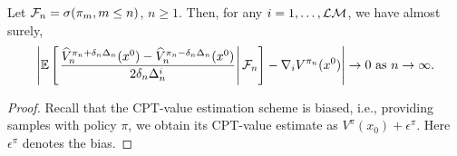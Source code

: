 \begin{lemma}
\label{lemma:1spsa-bias}
Let $\mathcal{F}_n = \sigma(\pi_m,m\le n)$, $n\ge 1$.
Then, for any $i = 1,\ldots,\mathcal{L}\mathcal{M}$, we have almost surely,  
\begin{align}
\left| \mathbb{E}\left[\left.\dfrac{\widehat V_n^{\pi_n + \delta_n \Delta_n}(x^0) -\widehat V_n^{\pi_n - \delta_n \Delta_n}(x^0)}{2 \delta_n \Delta_n^{i}}\right| \mathcal{F}_n \right] - \nabla_{i} V^{\pi_n}(x^0) \right| \rightarrow 0 \text{ as } n\rightarrow\infty.
\end{align} 
\end{lemma}
\begin{proof}
Recall that the CPT-value estimation scheme is biased, i.e., providing samples with policy $\pi$, we obtain its CPT-value estimate as $V^{\pi}(x_0) + \epsilon^\pi$. Here $\epsilon^\pi$ denotes the bias. 


\end{proof}
